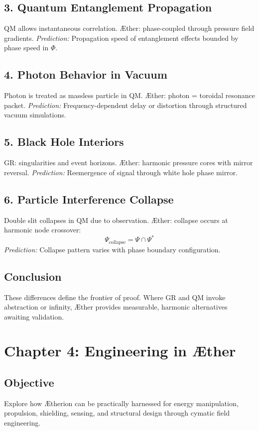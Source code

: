 \documentclass[12pt]{book}
\begin{document}
\subsection*{3. Quantum Entanglement Propagation}
QM allows instantaneous correlation.
Æther: phase-coupled through pressure field gradients.
\textit{Prediction:} Propagation speed of entanglement effects bounded by phase speed in $\Phi$.

\subsection*{4. Photon Behavior in Vacuum}
Photon is treated as massless particle in QM.
Æther: photon = toroidal resonance packet.
\textit{Prediction:} Frequency-dependent delay or distortion through structured vacuum simulations.

\subsection*{5. Black Hole Interiors}
GR: singularities and event horizons.
Æther: harmonic pressure cores with mirror reversal.
\textit{Prediction:} Reemergence of signal through white hole phase mirror.

\subsection*{6. Particle Interference Collapse}
Double slit collapses in QM due to observation.
Æther: collapse occurs at harmonic node crossover:
\[
\Psi_{\text{collapse}} = \Psi \cap \Psi^*
\]
\textit{Prediction:} Collapse pattern varies with phase boundary configuration.

\subsection*{Conclusion}
These differences define the frontier of proof. Where GR and QM invoke abstraction or infinity, Æther provides measurable, harmonic alternatives awaiting validation.




\section*{Chapter 4: Engineering in Æther}

\subsection*{Objective}
Explore how Ætherion can be practically harnessed for energy manipulation, propulsion, shielding, sensing, and structural design through cymatic field engineering.
\end{document}
